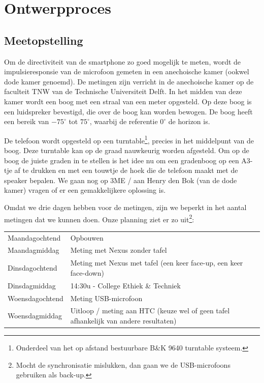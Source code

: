 \chapter{Ontwerpproces}

\section{Meetopstelling}
Om de directiviteit van de smartphone zo goed mogelijk te meten, wordt de impulsieresponsie van de microfoon gemeten in een anechoische kamer (ookwel dode kamer genoemd).
De metingen zijn verricht in de anechoische kamer op de faculteit TNW van de Technische Universiteit Delft.
In het midden van deze kamer wordt een boog met een straal van een meter opgesteld. Op deze boog is een luidspreker bevestigd, die over de boog kan worden bewogen.
De boog heeft een bereik van $-75^\circ$ tot $75^\circ$, waarbij de referentie $0^\circ$ de horizon is.

De telefoon wordt opgesteld op een turntable\footnote{Onderdeel van het op afstand bestuurbare B\&K 9640 turntable systeem.}, precies in het middelpunt van de boog.
Deze turntable kan op de graad nauwkeurig worden afgesteld.
Om op de boog de juiste graden in te stellen is het idee nu om een gradenboog op een A3-tje af te drukken en met een touwtje de hoek die de telefoon maakt met de speaker bepalen.
We gaan nog op 3ME / aan Henry den Bok (van de dode kamer) vragen of er een gemakkelijkere oplossing is.


Omdat we drie dagen hebben voor de metingen, zijn we beperkt in het aantal metingen dat we kunnen doen. Onze planning ziet er zo uit\footnote{Mocht de synchronisatie mislukken, dan gaan we de USB-microfoons gebruiken als back-up.}:
\begin{table}[h]
\begin{tabular}{|l|l|}
\hline
Maandagochtend & Opbouwen\\
Maandagmiddag & Meting met Nexus zonder tafel\\
\hline
Dinsdagochtend & Meting met Nexus met tafel (een keer face-up, een keer face-down)\\
Dinsdagmiddag & 14:30u - College Ethiek \& Techniek\\
\hline
Woensdagochtend & Meting USB-microfoon \\
Woensdagmiddag & Uitloop / meting aan HTC (keuze wel of geen tafel afhankelijk van andere resultaten)\\
\hline
\end{tabular}
\end{table}

